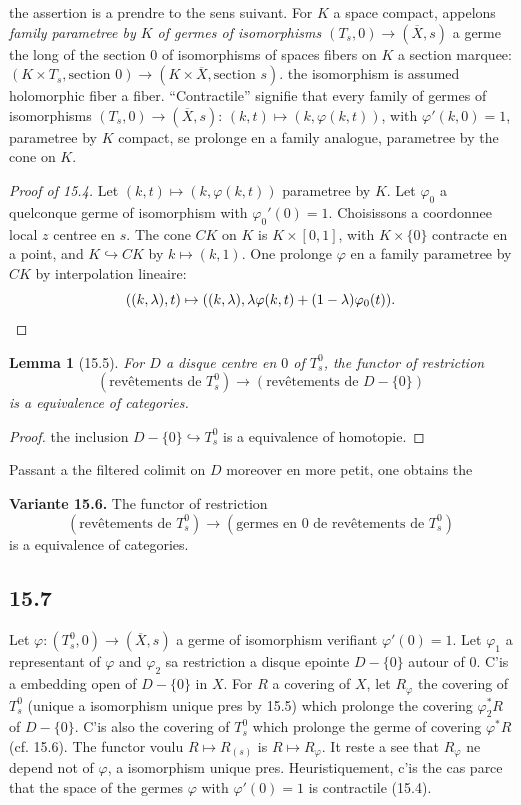 \documentclass[12pt,a4paper]{article}
\theoremstyle{plain}
\newtheorem{lemma}[theorem]{Lemma}
\theoremstyle{definition}
\theoremstyle{remark}
\begin{document}
the assertion is a prendre to the sens suivant. For $K$ a space compact, appelons \emph{family parametree by $K$ of germes of isomorphisms $(T_s, 0) \to (\overline{X}, s)$} a germe the long of the section $0$ of isomorphisms of spaces fibers on $K$ a section marquee: $(K \times T_s, \text{section } 0) \to (K \times \overline{X}, \text{section } s)$. the isomorphism is assumed holomorphic fiber a fiber. ``Contractile'' signifie that every family of germes of isomorphisms $(T_s, 0) \to (\overline{X}, s)$: $(k, t) \mapsto (k, \varphi(k,t))$, with $\varphi'(k, 0) = 1$, parametree by $K$ compact, se prolonge en a family analogue, parametree by the cone on $K$.

\begin{proof}[Proof of 15.4]
Let $(k, t) \mapsto (k, \varphi(k,t))$ parametree by $K$. Let $\varphi_0$ a quelconque germe of isomorphism with $\varphi_0'(0) = 1$. Choisissons a coordonnee local $z$ centree en $s$. The cone $CK$ on $K$ is $K \times [0, 1]$, with $K \times \{0\}$ contracte en a point, and $K \hookrightarrow CK$ by $k \mapsto (k, 1)$. One prolonge $\varphi$ en a family parametree by $CK$ by interpolation lineaire:
\[
((k, \lambda), t) \mapsto ((k, \lambda), \lambda \varphi(k,t) + (1-\lambda)\varphi_0(t)). \qedhere
\]
\end{proof}

\begin{lemma}[15.5]
For $D$ a disque centre en $0$ of $T_s^0$, the functor of restriction
\[
(\text{revêtements de } T_s^0) \to (\text{revêtements de } D - \{0\})
\]
is a equivalence of categories.
\end{lemma}

\begin{proof}
the inclusion $D - \{0\} \hookrightarrow T_s^0$ is a equivalence of homotopie.
\end{proof}

Passant a the filtered colimit on $D$ moreover en more petit, one obtains the

\textbf{Variante 15.6.} The functor of restriction
\[
(\text{revêtements de } T_s^0) \to (\text{germes en } 0 \text{ de revêtements de } T_s^0)
\]
is a equivalence of categories.

\subsection*{15.7}

Let $\varphi : (T_s^0, 0) \to (\overline{X}, s)$ a germe of isomorphism verifiant $\varphi'(0) = 1$. Let $\varphi_1$ a representant of $\varphi$ and $\varphi_2$ sa restriction a disque epointe $D - \{0\}$ autour of $0$. C'is a embedding open of $D - \{0\}$ in $X$. For $R$ a covering of $X$, let $R_\varphi$ the covering of $T_s^0$ (unique a isomorphism unique pres by 15.5) which prolonge the covering $\varphi_2^* R$ of $D - \{0\}$. C'is also the covering of $T_s^0$ which prolonge the germe of covering $\varphi^* R$ (cf. 15.6). The functor voulu $R \mapsto R_{(s)}$ is $R \mapsto R_\varphi$. It reste a see that $R_\varphi$ ne depend not of $\varphi$, a isomorphism unique pres. Heuristiquement, c'is the cas parce that the space of the germes $\varphi$ with $\varphi'(0) = 1$ is contractile (15.4).
\end{document}
